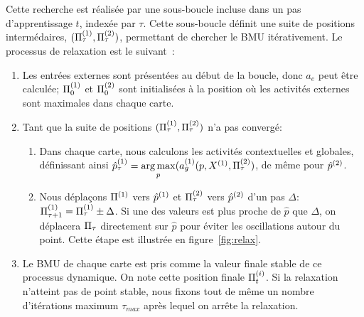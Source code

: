 \documentclass[../main]{subfiles}
\begin{document}
Cette recherche est réalisée par une sous-boucle incluse dans un pas d'apprentissage $t$, indexée par $\tau$. Cette sous-boucle définit une suite de positions intermédaires, $(\Pi^{({1})}_\tau , \Pi^{({2})}_\tau)$, permettant de chercher le BMU itérativement.
Le processus de relaxation est le suivant~:
\begin{enumerate}
\item Les entrées externes sont présentées au début de la boucle, donc $a_e$ peut être calculée; $\Pi^{({1})}_0$ et $\Pi^{({2})}_0$ sont initialisées à la position où les activités externes sont maximales dans chaque carte. 
\item Tant que la suite de positions $(\Pi^{({1})}_\tau,\Pi^{({2})}_\tau)$ n'a pas convergé:
	\begin{enumerate}
	\item Dans chaque carte, nous calculons les activités contextuelles et globales, définissant ainsi $\hat{p}^{({1})}_\tau = \operatorname*{arg\,max}\limits_p(a_g^{({1})}(p,X^{({1})}, \Pi^{({2})}_\tau)$, de même pour $\hat{p}^{({2})}$.
	\item Nous déplaçons $\Pi^{({1})}$ vers $\hat{p}^{({1})}$ et $\Pi^{({2})}_\tau$ vers $\hat{p}^{({2})}$ d'un pas $\Delta$: $\Pi^{({1})}_{\tau+1} = \Pi^{({1})}_{\tau} \pm \Delta$.
	Si une des valeurs est plus proche de $\hat{p}$ que $\Delta$, on déplacera $\Pi_\tau$ directement sur $\hat{p}$ pour éviter les oscillations autour du point. Cette étape est illustrée en figure~\ref{fig:relax}.
	\end{enumerate}
\item Le BMU de chaque carte est pris comme la valeur finale stable de ce processus dynamique. On note cette position finale $\Pi^{({i})}_t$.
Si la relaxation n'atteint pas de point stable, nous fixons tout de même un nombre d'itérations maximum $\tau_{max}$ après lequel on arrête la relaxation.
\end{enumerate}
\end{document}
